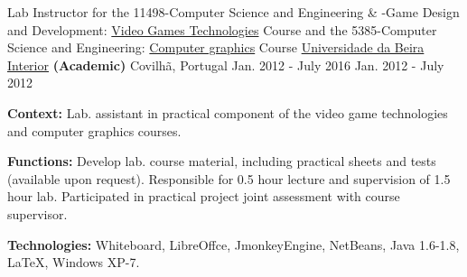 \begin{cventries}
  \cventry
    {Lab Instructor for the
        11498-Computer Science and Engineering \& -Game Design and Development: 
		\href{http://www.di.ubi.pt/~agomes/tjv/}{Video Games Technologies}	Course 
		\linebreak and the
		5385-Computer Science and Engineering: 		
		\href{http://www.di.ubi.pt/~agomes/cg/}{Computer graphics} Course} %
    {\href{http://www.ubi.pt}{Universidade da Beira Interior} \textbf{(Academic)}} %
    {Covilh\~a, Portugal} %
    {\linebreak Jan. 2012 - July 2016 \linebreak Jan. 2012 - July 2012} %
    {
      \begin{cvitems} %
		\item[] {\textbf{Context:} Lab. assistant in practical component of the video game technologies and computer graphics courses.}
		\item[] {\textbf{Functions:} Develop lab. course material, including practical sheets and tests (available upon request). Responsible for 0.5 hour lecture and supervision of 1.5 hour lab. Participated in practical project joint assessment with course supervisor.}
		\item[] {\textbf{Technologies:} \textcolor{rainbowcolor-green}{Whiteboard}, \textcolor{rainbowcolor-green}{LibreOffce}, \textcolor{rainbowcolor-green}{JmonkeyEngine}, \textcolor{rainbowcolor-green}{NetBeans}, \textcolor{rainbowcolor-indigo}{Java 1.6-1.8}, \textcolor{rainbowcolor-indigo}{LaTeX}, %
\textcolor{rainbowcolor-orange}{Windows XP-7}.}
      \end{cvitems}
    }       
    

\end{cventries}
